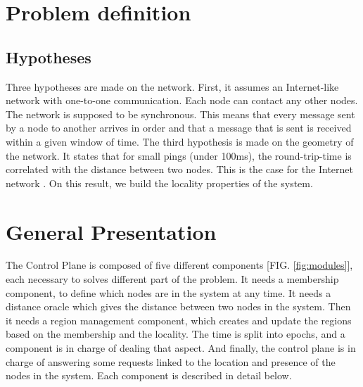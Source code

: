 \documentclass[a4paper,11pt,oneside]{report}
\begin{document}
\section{Problem definition}

\subsection{Hypotheses}
Three hypotheses are made on the network. First, it assumes an Internet-like
network with one-to-one communication. Each node can contact any other nodes.
The network is supposed to be synchronous. This means that every message sent by
a node to another arrives in order and that a message that is sent is
received within a given window of time. The third hypothesis is made on the
geometry of the network. It states that for small pings (under 100ms), the
round-trip-time is correlated with the distance between two nodes. This is the
case for the Internet network \cite{Seibert2014}. On this result, we build the
locality properties of the system. 


\section{General Presentation}

The Control Plane is composed of five different components [FIG.
\autoref{fig:modules}], each necessary to solves different part of the problem.
It needs a membership component, to define which nodes are in the
system at any time. It needs a distance oracle which gives the distance between
two nodes in the system. Then it needs a region management component, which
creates and update the regions based on the membership and the locality.
The time is split into epochs, and a component is in charge of dealing that
aspect. And finally, the control plane is in charge of answering some requests
linked to the location and presence of the nodes in the system. Each component
is described in detail below. 
\end{document}
